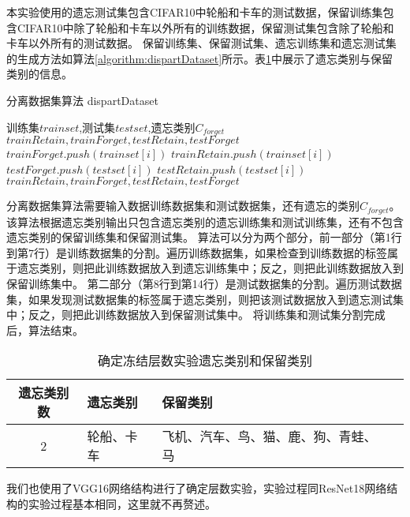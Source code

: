 本实验使用的遗忘测试集包含CIFAR10中轮船和卡车的测试数据，保留训练集包含CIFAR10中除了轮船和卡车以外所有的训练数据，保留测试集包含除了轮船和卡车以外所有的测试数据。
保留训练集、保留测试集、遗忘训练集和遗忘测试集的生成方法如算法\ref{algorithm:dispartDataset}所示。表\ref{tab:forget-continuous-2-kinds}中展示了遗忘类别与保留类别的信息。
\begin{algorithm}
	\renewcommand{\algorithmicrequire}{\textbf{Input:}}
	\renewcommand{\algorithmicensure}{\textbf{Output:}}
	\caption{分离数据集算法  dispartDataset}
	\label{algorithm:dispartDataset}
	\begin{algorithmic}[1]
        \REQUIRE 训练集$trainset$,测试集$testset$,遗忘类别$C_{forget}$
        \ENSURE  $trainRetain,trainForget,testRetain,testForget$
                \STATE $ trainForget.push(trainset[i])$
            \ELSE
                \STATE $ trainRetain.push(trainset[i])$
            \ENDIF
        \ENDFOR
                \STATE $ testForget.push(testset[i])$
            \ELSE
                \STATE $ testRetain.push(testset[i])$
            \ENDIF
        \ENDFOR
        \RETURN $trainRetain,trainForget,testRetain,testForget$
	\end{algorithmic}  
\end{algorithm}
分离数据集算法需要输入数据训练数据集和测试数据集，还有遗忘的类别$C_{forget}$。
该算法根据遗忘类别输出只包含遗忘类别的遗忘训练集和测试训练集，还有不包含遗忘类别的保留训练集和保留测试集。
算法可以分为两个部分，前一部分（第1行到第7行）是训练数据集的分割。遍历训练数据集，如果检查到训练数据的标签属于遗忘类别，则把此训练数据放入到遗忘训练集中；反之，则把此训练数据放入到保留训练集中。
第二部分（第8行到第14行）是测试数据集的分割。遍历测试数据集，如果发现测试数据集的标签属于遗忘类别，则把该测试数据放入到遗忘测试集中；反之，则把此训练数据放入到保留测试集中。
将训练集和测试集分割完成后，算法结束。

\begin{table}
    \centering
    \caption{确定冻结层数实验遗忘类别和保留类别}
    \begin{tabular}{cp{3cm}p{7cm}p{7cm}}
      \toprule 
      遗忘类别数  & 遗忘类别 & 保留类别  \\
      \midrule
      2 & 轮船、卡车  & 飞机、汽车、鸟、猫、鹿、狗、青蛙、马  \\
      \bottomrule
    \end{tabular}
    \label{tab:forget-continuous-2-kinds}
\end{table}
我们也使用了VGG16网络结构进行了确定层数实验，实验过程同ResNet18网络结构的实验过程基本相同，这里就不再赘述。

